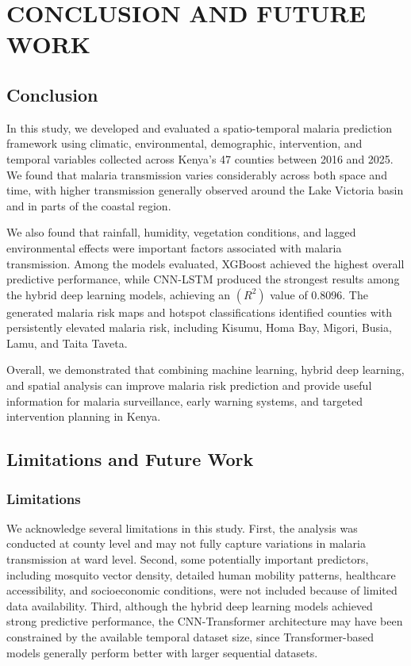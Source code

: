 

\chapter{CONCLUSION AND FUTURE WORK}

\section{Conclusion}

In this study, we developed and evaluated a spatio-temporal malaria prediction framework using climatic, environmental, demographic, intervention, and temporal variables collected across Kenya's 47 counties between 2016 and 2025. We found that malaria transmission varies considerably across both space and time, with higher transmission generally observed around the Lake Victoria basin and in parts of the coastal region.

We also found that rainfall, humidity, vegetation conditions, and lagged environmental effects were important factors associated with malaria transmission. Among the models evaluated, XGBoost achieved the highest overall predictive performance, while CNN-LSTM produced the strongest results among the hybrid deep learning models, achieving an $(R^2)$ value of 0.8096. The generated malaria risk maps and hotspot classifications identified counties with persistently elevated malaria risk, including Kisumu, Homa Bay, Migori, Busia, Lamu, and Taita Taveta.

Overall, we demonstrated that combining machine learning, hybrid deep learning, and spatial analysis can improve malaria risk prediction and provide useful information for malaria surveillance, early warning systems, and targeted intervention planning in Kenya.

\section{Limitations and Future Work}
\subsection{Limitations}
We acknowledge several limitations in this study. First, the analysis was conducted at county level and may not fully capture variations in malaria transmission at ward level. Second, some potentially important predictors, including mosquito vector density, detailed human mobility patterns, healthcare accessibility, and socioeconomic conditions, were not included because of limited data availability. Third, although the hybrid deep learning models achieved strong predictive performance, the CNN-Transformer architecture may have been constrained by the available temporal dataset size, since Transformer-based models generally perform better with larger sequential datasets.
